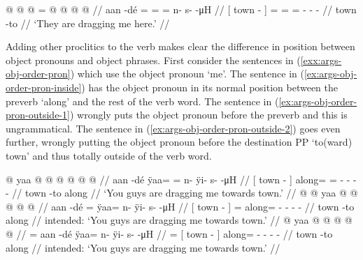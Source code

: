 \ex\label{ex:args-obj-preceding}%
\begingl
	\gla	{}  @ {} {}  @  @ = @  @ {} @ {} @ {} //
	\glb	{} aan -dé {} = = = n- s-  -μH //
	\glc	{}[ town - {}] = = = - -
			 -  //
	\gld	{} town -to {}     {} {} {} //
	\glft	‘They are dragging me here.’
		//
\endgl
\xe

Adding other proclitics to the verb makes clear the difference in position between object pronouns and object phrases.
First consider the sentences in (\ref{exx:args-obj-order-pron}) which use the object pronoun  ‘me’.
The sentence in (\ref{ex:args-obj-order-pron-inside}) has the object pronoun in its normal position between the preverb  ‘along’ and the rest of the verb word.
The sentence in (\ref{ex:args-obj-order-pron-outside-1}) wrongly puts the object pronoun before the preverb and this is ungrammatical.
The sentence in (\ref{ex:args-obj-order-pron-outside-2}) goes even further, wrongly putting the object pronoun before the destination PP  ‘to(ward) town’ and thus totally outside of the verb word.

\pex\label{exx:args-obj-order-pron}%
\a\label{ex:args-obj-order-pron-inside}%
%
\begingl
	\gla	{}  @ {} {} yaa @  @  @ {} @ {} @ {} @ {} //
	\glb	{} aan -dé {} ÿaa= = n- ÿi- s-  -μH //
	\glc	{}[ town - {}] along= = - - - 
			 - //
	\gld	{} town -to {} along   {} {} {} {} {} //
	\glft	‘You guys are dragging me towards town.’
		//
\endgl
\a\label{ex:args-obj-order-pron-outside-1}%
\ljudge{*}%
%
\begingl
	\gla	{}  @ {} {}  @ yaa @  @ {} @ {} @ {} @ {} //
	\glb	{} aan -dé {} = ÿaa= n- ÿi- s-  -μH //
	\glc	{}[ town - {}] = along= - - - 
			 - //
	\gld	{} town -to {}  along  {} {} {} {} {} //
	\glft	intended: ‘You guys are dragging me towards town.’
		//
\endgl
\a\label{ex:args-obj-order-pron-outside-2}%
\ljudge{*}%
%
\begingl
	\gla	{} {}  @ {} {} yaa @  @ {} @ {} @ {} @ {} //
	\glb	{}= {} aan -dé {} ÿaa= n- ÿi- s-  -μH //
	\glc	{}= {}[ town - {}] along= - - - 
			 - //
	\gld	{} {} town -to{} along  {} {} {} {} {} //
	\glft	intended: ‘You guys are dragging me towards town.’
		//
\endgl
\xe

